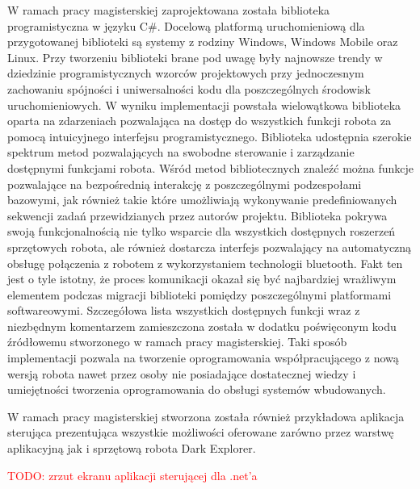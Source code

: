 W ramach pracy magisterskiej zaprojektowana została biblioteka programistyczna w
języku C\#. Docelową platformą uruchomieniową dla przygotowanej biblioteki są
systemy z rodziny Windows, Windows Mobile oraz Linux. Przy tworzeniu biblioteki
brane pod uwagę były najnowsze trendy w dziedzinie programistycznych wzorców
projektowych przy jednoczesnym zachowaniu spójności i uniwersalności kodu dla
poszczególnych środowisk uruchomieniowych. W wyniku implementacji powstała
wielowątkowa biblioteka oparta na zdarzeniach pozwalająca na dostęp do wszystkich
funkcji robota za pomocą intuicyjnego interfejsu programistycznego. Biblioteka
udostępnia szerokie spektrum metod pozwalających na swobodne sterowanie i
zarządzanie dostępnymi funkcjami robota. Wśród metod bibliotecznych znaleźć można
funkcje pozwalające na bezpośrednią interakcję z poszczególnymi podzespołami
bazowymi, jak również takie które umożliwiają wykonywanie predefiniowanych
sekwencji zadań przewidzianych przez autorów projektu. Biblioteka pokrywa swoją
funkcjonalnością nie tylko wsparcie dla wszystkich dostępnych roszerzeń
sprzętowych robota, ale również dostarcza interfejs pozwalający na automatyczną
obsługę połączenia z robotem z wykorzystaniem technologii bluetooth. Fakt ten
jest o tyle istotny, że proces komunikacji okazał się być najbardziej wrażliwym
elementem podczas migracji biblioteki pomiędzy poszczególnymi platformami
softwareowymi. Szczegółowa lista wszystkich dostępnych funkcji wraz z niezbędnym
komentarzem zamieszczona została w dodatku poświęconym kodu źródłowemu
stworzonego w ramach pracy magisterskiej. Taki sposób implementacji pozwala na
tworzenie oprogramowania współpracującego z nową wersją robota nawet przez osoby
nie posiadające dostatecznej wiedzy i umiejętności tworzenia oprogramowania do
obsługi systemów wbudowanych.

W ramach pracy magisterskiej stworzona została również przykładowa aplikacja
sterująca prezentująca wszystkie możliwości oferowane zarówno przez warstwę
aplikacyjną jak i sprzętową robota Dark Explorer. 

\textcolor{red}{TODO: zrzut ekranu aplikacji sterującej dla .net'a}